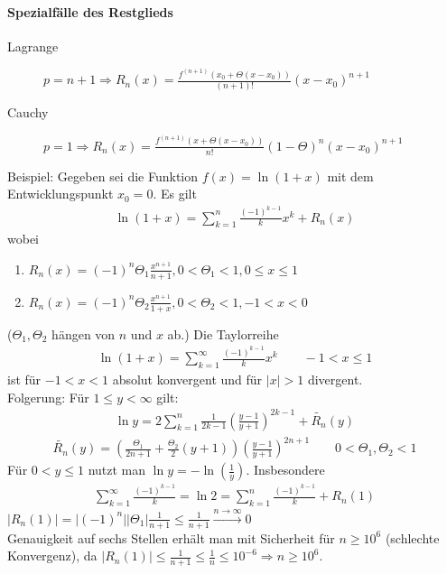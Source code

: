 \documentclass[ngerman,titlepage,twoside, parskip=half*]{scrreprt}
\theoremstyle{plain}
\theoremstyle{definition}
\theoremstyle{remark}
\newcommand*{\abs}[2][]{#1\lvert#2#1\rvert}
\begin{document}
\paragraph{Spezialfälle des Restglieds}
\begin{description}
  \item[Lagrange] $p=n+1\Rightarrow R_n(x)=\frac{f^{(n+1)}(x_0+\Theta(x-x_0))}{(n+1)!}(x-x_0)^{n+1}$
  \item[Cauchy] $p=1\Rightarrow R_n(x)=\frac{f^{(n+1)}(x+\Theta(x-x_0))}{n!}(1-\Theta)^n(x-x_0)^{n+1}$
\end{description}

Beispiel: Gegeben sei die Funktion $f(x)=\ln(1+x)$ mit dem
Entwicklungspunkt $x_0=0$. Es gilt
\begin{gather}
  \label{eq:y2}
  \ln(1+x)=\sum_{k=1}^n \frac{(-1)^{k-1}}{k}x^k+R_n(x)
\end{gather}
wobei
\begin{enumerate}
  \item $R_n(x)=(-1)^n\Theta_1\frac{x^{n+1}}{n+1}, 0<\Theta_1<1, 0\leq x\leq 1$
  \item $R_n(x)=(-1)^n\Theta_2\frac{x^{n+1}}{1+x}, 0<\Theta_2<1, -1<x<0$
\end{enumerate}
($\Theta_1, \Theta_2$ hängen von $n$ und $x$ ab.)
Die Taylorreihe
\begin{gather*}\ln(1+x)=\sum_{k=1}^\infty \frac{(-1)^{k-1}}{k}x^k\qquad -1<x\leq 1\end{gather*}
ist für $-1<x<1$ absolut konvergent und für $\abs{x}>1$ divergent.\\
Folgerung: Für $1\leq y<\infty$ gilt: 
\begin{gather*}
  \ln y=2\sum_{k=1}^n \frac{1}{2k-1}\left(\frac{y-1}{y+1}\right)^{2k-1}
  +\widetilde{R_n}(y)
\end{gather*}
\begin{gather*}\widetilde{R_n}(y)=\left(\frac{\Theta_1}{2n+1}+\frac{\Theta_2}{2}(y+1)\right)
\left(\frac{y-1}{y+1}\right)^{2n+1}\qquad 0<\Theta_1,\Theta_2<1\end{gather*}
Für $0<y\leq 1$ nutzt man $\ln y=-\ln(\frac{1}{y})$. Insbesondere
\begin{gather*}\sum_{k=1}^\infty \frac{(-1)^{k-1}}{k}=\ln 2=\sum_{k=1}^n
\frac{(-1)^{k-1}}{k}+R_n(1)\end{gather*}
$\abs{R_n(1)}=\abs{(-1)^n}\abs{\Theta_1}\frac{1}{n+1}\leq\frac{1}{n+1}
\xrightarrow{n\rightarrow\infty}0$\\
Genauigkeit auf sechs Stellen erhält man mit Sicherheit für $n\geq 10^6$
(schlechte Konvergenz), da  $\abs{R_n(1)}\leq \frac{1}{n+1}\leq \frac{1}{n}\leq 10^{-6}
\Rightarrow n\geq 10^6$.
\end{document}
